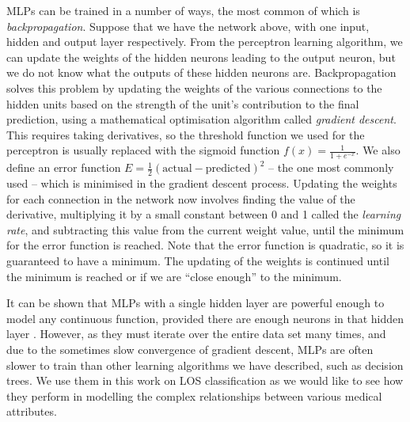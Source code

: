 \begin{figure}[h]
\label{fig:mlp}
\caption{}
\centering
\end{figure}

MLPs can be trained in a number of ways, the most common of which is
\textit{backpropagation}. Suppose that we have the network above, with one
input, hidden and output layer respectively. From the perceptron learning
algorithm, we can update the weights of the hidden neurons leading to the
output neuron, but we do not know what the outputs of these hidden neurons are.
Backpropagation solves this problem by updating the weights of the various
connections to the hidden units based on the strength of the unit's
contribution to the final prediction, using a mathematical optimisation
algorithm called \textit{gradient descent}. This requires taking derivatives,
so the threshold function we used for the perceptron is usually replaced with
the sigmoid function $f(x) = \frac{1}{1+e^{-x}}$. We also define an error
function $E=\frac{1}{2}(\text{actual} - \text{predicted})^2$ -- the one most
commonly used -- which is
minimised in the gradient descent process. Updating the weights for each
connection in the network now involves finding the value of the derivative,
multiplying it by a small constant between 0 and 1 called the
\textit{learning rate}, and subtracting this value from the current weight
value, until the minimum for the error function is reached. Note that the
error function is quadratic, so it is guaranteed to have a minimum. The
updating of the weights is continued until the minimum is reached or if we
are ``close enough'' to the minimum.

It can be shown that MLPs with a single hidden layer are powerful enough to
model any continuous function, provided there are enough neurons in that
hidden layer \cite{Hand2001}. However, as they must iterate over the entire
data set many times, and due to the sometimes slow convergence of gradient
descent, MLPs are often slower to train than other learning algorithms we
have described, such as decision trees. We use them in this work on LOS
classification as we would like to see how they perform in modelling the
complex relationships between various medical attributes.

